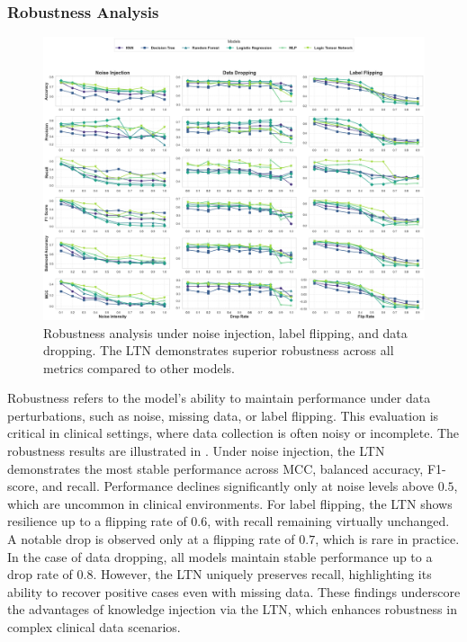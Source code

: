 %
\subsubsection{Robustness Analysis}
\label{subsubsec:robustness-analysis}
%
\begin{figure}
    \centering
    \includegraphics[width=\linewidth]{figures/ski-diabetes-robustness}
    \caption[Robustness analysis under noise injection, label flipping, and data dropping]{
        Robustness analysis under noise injection, label flipping, and data dropping.
        The \gls{LTN} demonstrates superior robustness across all metrics compared to other models.
    }
    \label{fig:robustness-analysis}
\end{figure}
%
Robustness refers to the model's ability to maintain performance under data perturbations, such as noise, missing data, or label flipping.
%
This evaluation is critical in clinical settings, where data collection is often noisy or incomplete.
%
The robustness results are illustrated in .
%
Under noise injection, the \gls{LTN} demonstrates the most stable performance across \gls{MCC}, balanced accuracy, F1-score, and recall.
%
Performance declines significantly only at noise levels above \(0.5\), which are uncommon in clinical environments.
%
For label flipping, the \gls{LTN} shows resilience up to a flipping rate of \(0.6\), with recall remaining virtually unchanged.
%
A notable drop is observed only at a flipping rate of \(0.7\), which is rare in practice.
%
In the case of data dropping, all models maintain stable performance up to a drop rate of \(0.8\).
%
However, the \gls{LTN} uniquely preserves recall, highlighting its ability to recover positive cases even with missing data.
%
These findings underscore the advantages of knowledge injection via the \gls{LTN}, which enhances robustness in complex clinical data scenarios.


